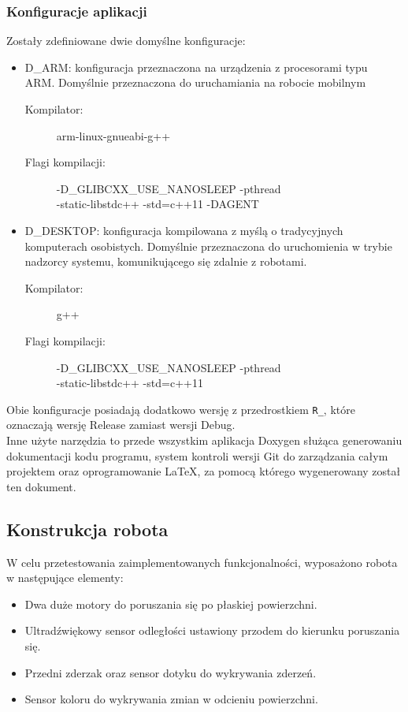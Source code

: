 \subsubsection{Konfiguracje aplikacji}
Zostały zdefiniowane dwie domyślne konfiguracje:
\begin{itemize}
    \item D\_ARM: konfiguracja przeznaczona na urządzenia z procesorami typu\\ ARM. Domyślnie przeznaczona do uruchamiania na robocie mobilnym
    \begin{description}
        \item[{\small Kompilator:}] {\small arm-linux-gnueabi-g++}
        \item[{\small Flagi kompilacji:}] {\small -D\_GLIBCXX\_USE\_NANOSLEEP -pthread\\ -static-libstdc++ -std=c++11 -DAGENT}
    \end{description}
    \item D\_DESKTOP: konfiguracja kompilowana z myślą o tradycyjnych komputerach osobistych. Domyślnie przeznaczona do uruchomienia w trybie nadzorcy systemu, komunikującego się zdalnie z robotami.
    \begin{description}
        \item[{\small Kompilator:}] {\small g++}
        \item[{\small Flagi kompilacji:}] {\small -D\_GLIBCXX\_USE\_NANOSLEEP -pthread\\ -static-libstdc++ -std=c++11}
    \end{description}
\end{itemize}
\noindent Obie konfiguracje posiadają dodatkowo wersję z przedrostkiem {\tt R\_}, które oznaczają wersję Release zamiast wersji Debug.\\

Inne użyte narzędzia to przede wszystkim aplikacja Doxygen służąca generowaniu dokumentacji kodu programu, system kontroli wersji Git do zarządzania całym projektem oraz oprogramowanie LaTeX, za pomocą którego wygenerowany został ten dokument.

\subsection{Konstrukcja robota}
W celu przetestowania zaimplementowanych funkcjonalności, wyposażono robota w następujące elementy:
\begin{itemize}
    \item Dwa duże motory do poruszania się po płaskiej powierzchni.
    \item Ultradźwiękowy sensor odległości ustawiony przodem do kierunku poruszania się.
    \item Przedni zderzak oraz sensor dotyku do wykrywania zderzeń.
    \item Sensor koloru do wykrywania zmian w odcieniu powierzchni.
\end{itemize}
